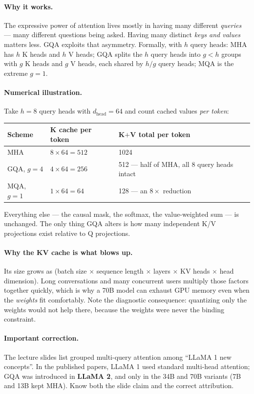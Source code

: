 \documentclass[11pt,a4paper]{article}
\begin{document}
\paragraph{Why it works.} The expressive power of attention lives mostly in having many
different \emph{queries} --- many different questions being asked. Having many distinct
\emph{keys and values} matters less. GQA exploits that asymmetry. Formally, with $h$ query
heads: MHA has $h$ K heads and $h$ V heads; GQA splits the $h$ query heads into $g < h$ groups
with $g$ K heads and $g$ V heads, each shared by $h/g$ query heads; MQA is the extreme
$g = 1$.

\paragraph{Numerical illustration.} Take $h = 8$ query heads with $d_{\text{head}} = 64$ and
count cached values \emph{per token}:
\begin{center}
\begin{tabularx}{\textwidth}{lYY}
\textbf{Scheme} & \textbf{K cache per token} & \textbf{K$+$V total per token} \\
\hline
MHA & $8 \times 64 = 512$ & 1024 \\
GQA, $g = 4$ & $4 \times 64 = 256$ & 512 --- half of MHA, all 8 query heads intact \\
MQA, $g = 1$ & $1 \times 64 = 64$ & 128 --- an $8\times$ reduction \\
\end{tabularx}
\end{center}
Everything else --- the causal mask, the softmax, the value-weighted sum --- is unchanged. The
only thing GQA alters is how many independent K/V projections exist relative to Q projections.

\paragraph{Why the KV cache is what blows up.} Its size grows as (batch size $\times$ sequence
length $\times$ layers $\times$ KV heads $\times$ head dimension). Long conversations and many
concurrent users multiply those factors together quickly, which is why a 70B model can exhaust
GPU memory even when the \emph{weights} fit comfortably. Note the diagnostic consequence:
quantizing only the weights would not help there, because the weights were never the binding
constraint.

\paragraph{Important correction.} The lecture slides list grouped multi-query attention among
``LLaMA 1 new concepts''. In the published papers, LLaMA 1 used standard multi-head
attention; GQA was introduced in \textbf{LLaMA 2}, and only in the 34B and 70B variants
(7B and 13B kept MHA). Know both the slide claim and the correct attribution.
\end{document}
